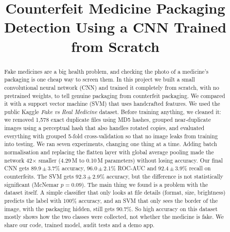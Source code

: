 \documentclass[conference]{IEEEtran}
\newcommand{\pmv}[2]{#1\,$\pm$\,#2}
\begin{document}
\raggedbottom

\title{Counterfeit Medicine Packaging Detection Using a CNN Trained from Scratch}

\author{
\and
{}
\and
{}
}

\maketitle

\begin{abstract}
Fake medicines are a big health problem, and checking the photo of a medicine's packaging is one cheap way to screen them. In this project we built a small convolutional neural network (CNN) and trained it completely from scratch, with no pretrained weights, to tell genuine packaging from counterfeit packaging. We compared it with a support vector machine (SVM) that uses handcrafted features. We used the public Kaggle \emph{Fake vs Real Medicine} dataset. Before training anything, we cleaned it: we removed 1{,}578 exact duplicate files using MD5 hashes, grouped near-duplicate images using a perceptual hash that also handles rotated copies, and evaluated everything with grouped 5-fold cross-validation so that no image leaks from training into testing. We ran seven experiments, changing one thing at a time. Adding batch normalisation and replacing the flatten layer with global average pooling made the network 42$\times$ smaller (4.29\,M to 0.10\,M parameters) without losing accuracy. Our final CNN gets \pmv{89.9}{3.7}\% accuracy, \pmv{96.0}{2.1}\% ROC-AUC and \pmv{92.4}{3.9}\% recall on counterfeits. The SVM gets \pmv{92.3}{2.9}\% accuracy, but the difference is not statistically significant (McNemar $p=0.09$). The main thing we found is a problem with the dataset itself. A simple classifier that only looks at file details (format, size, brightness) predicts the label with 100\% accuracy, and an SVM that only sees the border of the image, with the packaging hidden, still gets 90.7\%. So high accuracy on this dataset mostly shows how the two classes were collected, not whether the medicine is fake. We share our code, trained model, audit tests and a demo app.
\end{abstract}
\end{document}
